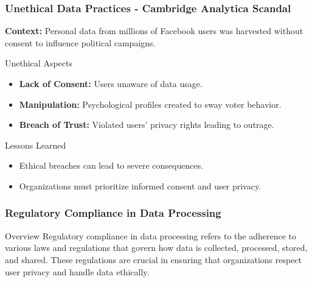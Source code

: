 \documentclass[aspectratio=169]{beamer}
\begin{document}
\begin{frame}[fragile]
    \frametitle{Unethical Data Practices - Cambridge Analytica Scandal}
    
    \textbf{Context:} Personal data from millions of Facebook users was harvested without consent to influence political campaigns.
    
    \begin{block}{Unethical Aspects}
        \begin{itemize}
            \item \textbf{Lack of Consent:} Users unaware of data usage.
            \item \textbf{Manipulation:} Psychological profiles created to sway voter behavior.
            \item \textbf{Breach of Trust:} Violated users' privacy rights leading to outrage.
        \end{itemize}
    \end{block}
    
    \begin{block}{Lessons Learned}
        \begin{itemize}
            \item Ethical breaches can lead to severe consequences.
            \item Organizations must prioritize informed consent and user privacy.
        \end{itemize}
    \end{block}
\end{frame}

\begin{frame}[fragile]
    \frametitle{Regulatory Compliance in Data Processing}
    \begin{block}{Overview}
        Regulatory compliance in data processing refers to the adherence to various laws and regulations that govern how data is collected, processed, stored, and shared. These regulations are crucial in ensuring that organizations respect user privacy and handle data ethically.
    \end{block}
\end{frame}
\end{document}
